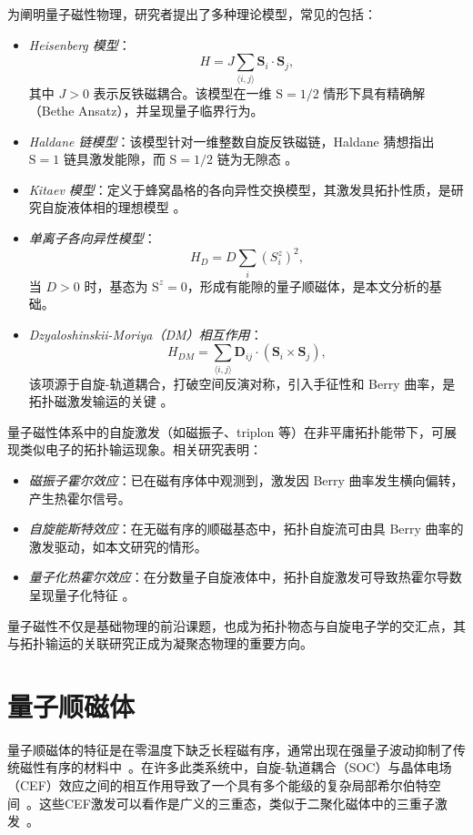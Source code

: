 为阐明量子磁性物理，研究者提出了多种理论模型，常见的包括：

\begin{itemize}
    \item \emph{Heisenberg 模型}：
    \[
    H = J \sum_{\langle i,j \rangle} \mathbf{S}_i \cdot \mathbf{S}_j,
    \]
    其中 $J>0$ 表示反铁磁耦合。该模型在一维 $\mathrm{S}=1/2$ 情形下具有精确解（Bethe Ansatz），并呈现量子临界行为。
    \item \emph{Haldane 链模型}：该模型针对一维整数自旋反铁磁链，Haldane 猜想指出 $\mathrm{S}=1$ 链具激发能隙，而 $\mathrm{S}=1/2$ 链为无隙态 \cite{haldane1983Continuum}。
    \item \emph{Kitaev 模型}：定义于蜂窝晶格的各向异性交换模型，其激发具拓扑性质，是研究自旋液体相的理想模型 \cite{kitaev2006Anyons}。
    \item \emph{单离子各向异性模型}：
    \[
    H_D = D \sum_i (S^z_i)^2,
    \]
    当 $D>0$ 时，基态为 $\mathrm{S}^z=0$，形成有能隙的量子顺磁体，是本文分析的基础。
    \item \emph{Dzyaloshinskii-Moriya（DM）相互作用}：
    \[
    H_{DM} = \sum_{\langle i,j \rangle} \mathbf{D}_{ij} \cdot (\mathbf{S}_i \times \mathbf{S}_j),
    \]
    该项源于自旋-轨道耦合，打破空间反演对称，引入手征性和 Berry 曲率，是拓扑磁激发输运的关键 \cite{dzyaloshinsky1958thermodynamic}。
\end{itemize}

量子磁性体系中的自旋激发（如磁振子、triplon 等）在非平庸拓扑能带下，可展现类似电子的拓扑输运现象。相关研究表明：

\begin{itemize}
    \item \emph{磁振子霍尔效应}：已在磁有序体中观测到，激发因 Berry 曲率发生横向偏转，产生热霍尔信号。
    \item \emph{自旋能斯特效应}：在无磁有序的顺磁基态中，拓扑自旋流可由具 Berry 曲率的激发驱动，如本文研究的情形。
    \item \emph{量子化热霍尔效应}：在分数量子自旋液体中，拓扑自旋激发可导致热霍尔导数呈现量子化特征 \cite{kasahara2018Majorana}。
\end{itemize}

量子磁性不仅是基础物理的前沿课题，也成为拓扑物态与自旋电子学的交汇点，其与拓扑输运的关联研究正成为凝聚态物理的重要方向。

    
\section{量子顺磁体}
量子顺磁体的特征是在零温度下缺乏长程磁有序，通常出现在强量子波动抑制了传统磁性有序的材料中~\cite{knolle2019Field}。在许多此类系统中，自旋-轨道耦合（SOC）与晶体电场（CEF）效应之间的相互作用导致了一个具有多个能级的复杂局部希尔伯特空间~\cite{rau2016SpinOrbit}。这些CEF激发可以看作是广义的三重态，类似于二聚化磁体中的三重子激发~\cite{akbari2023Topological, mcclarty2017Topological, romhanyi2015Hall}。

